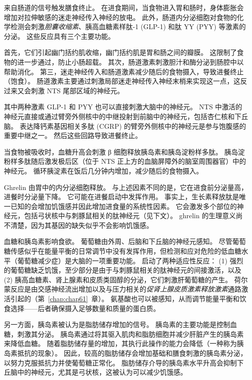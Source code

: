 来自肠道的信号触发膳食终止。
在进食期间，当食物进入胃和肠时，身体膨胀会增加对拉伸敏感的迷走神经传入神经的放电。
此外，肠道内分泌细胞对食物的化学检测会刺激\textit{胆囊收缩素}、胰高血糖素样肽-1 (GLP-1) 和肽 YY (PYY) 等激素的分泌。
这些反应具有三个主要功能。


首先，它们引起幽门括约肌收缩，幽门括约肌是胃和肠之间的瓣膜。
这限制了食物的进一步通过，防止小肠超载。
其次，肠道激素刺激胆汁和酶分泌到肠腔中以帮助消化。
第三，迷走神经传入和肠道激素减少随后的食物摄入，导致进餐终止（饱食）。
肠道激素主要通过刺激局部迷走神经传入神经末梢来实现这一点，这反过来又会刺激 NTS 尾部区域的神经元。


其中两种激素 GLP-1 和 PYY 也可以直接刺激大脑中的神经元。
NTS 中激活的神经元直接或通过臂旁外侧核中的中继投射到前脑中的神经元，包括杏仁核和下丘脑。
表达降钙素基因相关多肽 (CGRP) 的臂旁外侧核中的神经元是参与饱腹感的重要中继之一。
然后这些回路导致进餐终止。


当食物被吸收时，血糖升高会刺激 β 细胞释放胰岛素和胰岛淀粉样多肽。
胰岛淀粉样多肽随后激发极后区（位于 NTS 正上方的血脑屏障外的脑室周围器官）中的神经元。
循环胰淀素在饭后几分钟内增加，减少随后的食物摄入。


Ghrelin 由胃中的内分泌细胞释放。
与上述因素不同的是，它在进食前分泌量高，进餐时分泌量下降。
它可能在进餐启动中发挥作用。
事实上，生长素释放肽是唯一已知的会增加饥饿感并因此增加进食量的系统性因素。
它会激发多个部位的神经元，包括弓状核中与刺豚鼠相关的肽神经元（见下文）。
ghrelin 的生理意义尚不清楚，因为其基因的缺失似乎不会影响饥饿感。


血糖和胰岛素影响食欲。
葡萄糖由外周、后脑和下丘脑的神经元感知。
尽管葡萄糖传感似乎在能量平衡的日常调节中没有发挥作用，但检测和应对危险的低血糖水平（葡萄糖减少症）是大脑的一项重要功能。
启动了两种适应性反应：
(1) 强烈的葡萄糖缺乏饥饿，至少部分是由于与刺豚鼠相关的肽神经元的间接激活，以及 (2) 胰高血糖素、肾上腺素和皮质类固醇的分泌，它们刺激肝葡萄糖的产生。
荷尔蒙反应是由交感神经流出增加以及与压力相关的\textit{促肾上腺皮质激素释放激素}通路激活引起的（第~\ref{chap:chap61}~章）。
氨基酸也可以被感知，从而调节能量平衡和饮食选择——后者确保摄入足够数量和质量的蛋白质。


另一方面，胰岛素被认为是脂肪储存增加的信号。
胰岛素的主要功能是控制血糖，刺激其分泌。
胰岛素通过将其驱入肌肉和脂肪细胞并减少肝脏产生的胰岛素来降低血糖。
随着脂肪储存量的增加，其执行此操作的能力会降低（一种称为胰岛素抵抗的现象）。
因此，较高的脂肪储存会增加基础和膳食刺激的胰岛素分泌，以努力克服抵抗力并使葡萄糖正常化。
脂肪储存介导的胰岛素水平升高会抑制下丘脑中的神经元，尤其是弓状核，这被认为可以减少饥饿感。


